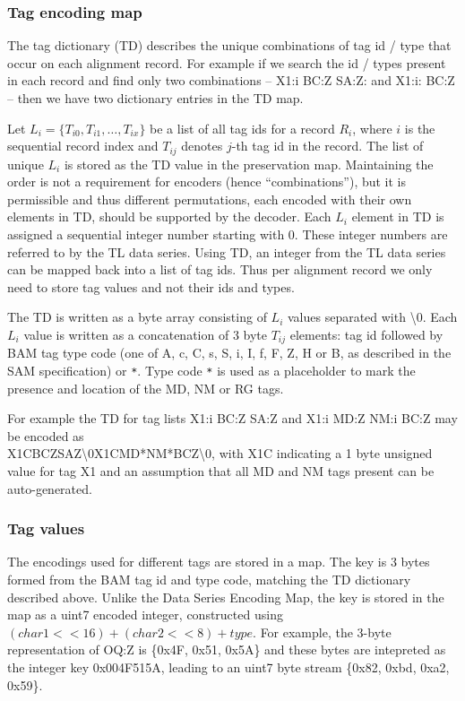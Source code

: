 \documentclass[a4paper]{article}
\begin{document}
\subsubsection{Tag encoding map}
\label{subsubsec:tags}

The tag dictionary (TD) describes the unique combinations of tag id / type that occur on each alignment record.
For example if we search the id / types present in each record and find only two combinations -- X1:i BC:Z SA:Z: and X1:i: BC:Z -- then we have two dictionary entries in the TD map.

Let $L_{i}=\{T_{i0}, T_{i1}, \ldots, T_{ix}\}$ be a list of all tag ids for a record $R_{i}$, where $i$ is the sequential record index and $T_{ij}$ denotes $j$-th tag id in the record.
The list of unique $L_{i}$ is stored as the TD value in the preservation map.
Maintaining the order is not a requirement for encoders (hence ``combinations''), but it is permissible and thus different permutations, each encoded with their own elements in TD, should be supported by the decoder.
Each $L_{i}$ element in TD is assigned a sequential integer number starting with 0.
These integer numbers are referred to by the TL data series.
Using TD, an integer from the TL data series can be mapped back into a list of tag ids.
Thus per alignment record we only need to store tag values and not their ids and types.

The TD is written as a byte array consisting of $L_{i}$ values separated with \textbackslash{}0.
Each $L_{i}$ value is written as a concatenation of 3 byte $T_{ij}$ elements: tag id followed by BAM tag type code (one of A, c, C, s, S, i, I, f, F, Z, H or B, as described in the SAM specification) or \texttt{*}.
Type code \texttt{*} is used as a placeholder to mark the presence and location of the MD, NM or RG tags.

For example the TD for tag lists X1:i BC:Z SA:Z and X1:i MD:Z NM:i BC:Z may be encoded as\\
X1CBCZSAZ\textbackslash{}0X1CMD*NM*BCZ\textbackslash{}0, with X1C indicating a 1 byte unsigned value for tag X1 and an assumption that all MD and NM tags present can be auto-generated.

\subsubsection*{Tag values}

The encodings used for different tags are stored in a map.
The key is 3 bytes formed from the BAM tag id and type code, matching the TD dictionary described above.
Unlike the Data Series Encoding Map, the key is stored in the map as a uint7 encoded integer, constructed using $(char1<<16) + (char2<<8) + type$.
For example, the 3-byte representation of OQ:Z is \{0x4F, 0x51, 0x5A\} and these bytes are intepreted as the integer key 0x004F515A, leading to an uint7 byte stream \{0x82, 0xbd, 0xa2, 0x59\}.
\end{document}

